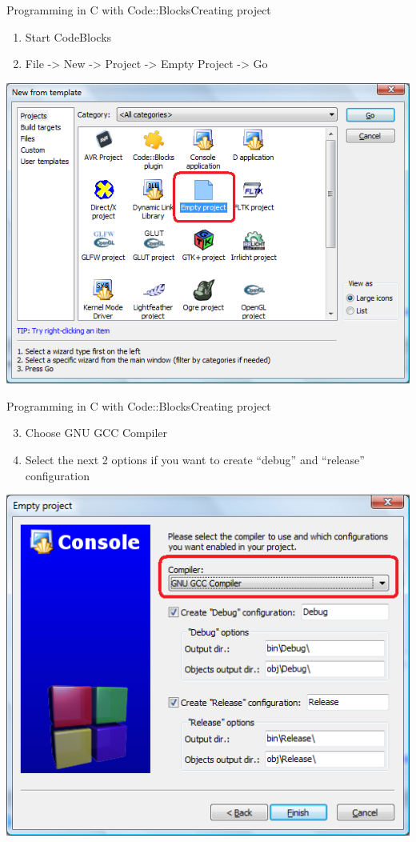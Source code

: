 \begin{frame}{Programming in C with Code::Blocks}{Creating project}
\begin{enumerate}
  \item Start CodeBlocks
  \item File -> New -> Project -> Empty Project -> Go 
\end{enumerate}
\begin{center}
\includegraphics[scale=0.3]{images/cb_new}
\end{center}
\end{frame}

\begin{frame}{Programming in C with Code::Blocks}{Creating project}
\begin{enumerate}
\setcounter{enumi}{2}
  \item Choose  GNU GCC Compiler
  \item Select the next 2 options if you want to create ``debug'' and ``release'' configuration
\end{enumerate}
\begin{center}
\includegraphics[scale=0.3]{images/cb_compiler}
\end{center}
\end{frame}

